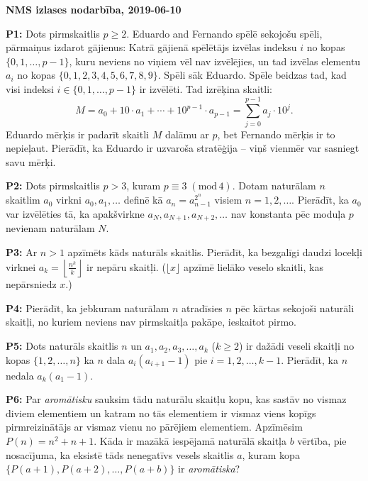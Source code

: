 \documentclass[11pt]{article}
\newenvironment{uzdevums}[1][\unskip]{%
\vspace{3mm}
\noindent
\textbf{#1:}
\noindent}
{}
\begin{document}
\thispagestyle{empty}

{\Large \bf NMS izlases nodarbība, 2019-06-10}

\begin{uzdevums}[P1]
Dots pirmskaitlis $p \geq 2$.
Eduardo and Fernando spēlē sekojošu spēli, pārmaiņus
izdarot gājienus: Katrā gājienā spēlētājs izvēlas 
indeksu $i$ no kopas 
$\{0,1,\ldots,p-1\}$, 
kuru neviens no viņiem vēl nav izvēlējies, un 
tad izvēlas elementu $a_i$ no kopas
$\{0, 1, 2, 3, 4, 5, 6, 7, 8, 9\}$. 
Spēli sāk Eduardo. Spēle beidzas tad, kad visi 
indeksi $i \in \{0,1,\ldots,p-1\}$ ir izvēlēti. 
Tad izrēķina skaitli: 
$$M = a_0 + 10 \cdot a_1 + \cdots + 
10^{p-1} \cdot a_{p-1} =
\sum_{j=0}^{p-1} a_j \cdot 10^j.$$
Eduardo mērķis ir padarīt skaitli $M$ dalāmu ar $p$, 
bet Fernando mērķis ir to nepieļaut.  
Pierādīt, ka Eduardo ir uzvaroša stratēģija -- viņš
vienmēr var sasniegt savu mērķi.
\end{uzdevums}

\begin{uzdevums}[P2]
Dots pirmskaitlis $p>3$, kuram $p \equiv 3\;(\mbox{mod}\,4)$. 
Dotam naturālam $n$
skaitlim $a_0$ virkni $a_0, a_1,\ldots$ definē kā 
$a_n = a_{n-1}^{2^n}$ visiem $n = 1, 2,\ldots$. 
Pierādīt, ka $a_0$ var izvēlēties
tā, ka apakšvirkne $a_N, a_{N+1}, a_{N+2},\ldots$ nav konstanta 
pēc moduļa $p$ nevienam naturālam $N$.
\end{uzdevums}

\begin{uzdevums}[P3]
Ar $n > 1$ apzīmēts kāds naturāls skaitlis. Pierādīt, ka
bezgalīgi daudzi locekļi virknei 
$a_k=\left\lfloor\frac{n^k}{k}\right\rfloor$
ir nepāru skaitļi. ($\lfloor x\rfloor$ apzīmē 
lielāko veselo skaitli, kas nepārsniedz $x$.)
\end{uzdevums}

\begin{uzdevums}[P4]
Pierādīt, ka jebkuram naturālam $n$ atradīsies
$n$ pēc kārtas sekojoši naturāli skaitļi, no kuriem neviens
nav pirmskaitļa pakāpe, ieskaitot pirmo. 
\end{uzdevums}

\begin{uzdevums}[P5]
Dots naturāls skaitlis $n$ un $a_1, a_2, a_3, \ldots, a_k$ ($k \geq 2$) 
ir dažādi veseli skaitļi no kopas $\{1, 2, \ldots , n\}$ ka $n$ dala $a_i (a_{i+1} - 1)$
pie $i = 1, 2,\ldots,k-1$. Pierādīt, ka $n$ nedala $a_k(a_1-1)$.
\end{uzdevums}



\begin{uzdevums}[P6]
Par {\em aromātisku} sauksim tādu naturālu skaitļu kopu, 
kas sastāv no vismaz diviem elementiem un katram no tās
elementiem ir vismaz viens kopīgs pirmreizinātājs ar 
vismaz vienu no pārējiem elementiem. Apzīmēsim 
$P(n)=n^2+n+1$. Kāda ir mazākā iespējamā naturālā skaitļa 
$b$ vērtība, pie nosacījuma, ka eksistē tāds nenegatīvs 
vesels skaitlis $a$, kuram kopa\\ 
$\{P(a+1),P(a+2),\ldots,P(a+b)\}$ ir {\em aromātiska}?
\end{uzdevums}
\end{document}
